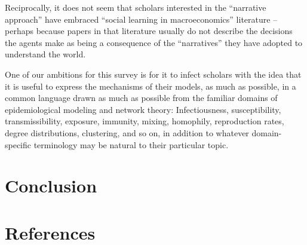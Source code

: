 Reciprocally, it does not seem that scholars interested in the ``narrative approach'' have embraced ``social learning in macroeconomics'' literature -- perhaps because papers in that literature usually do not describe the decisions the agents make as being a consequence of the ``narratives'' they have adopted to understand the world.

One of our ambitions for this survey is for it to infect scholars with the idea that it is useful to express the mechanisms of their models, as much as possible, in a common language drawn as much as possible from the familiar domains of epidemiological modeling and network theory:  Infectiousness, susceptibility, transmissibility, exposure, immunity, mixing, homophily, reproduction rates, degree distributions, clustering, and so on, in addition to whatever domain-specific terminology may be natural to their particular topic.

\section{Conclusion}




% 



% 
% 

\pagebreak
\section*{References}


